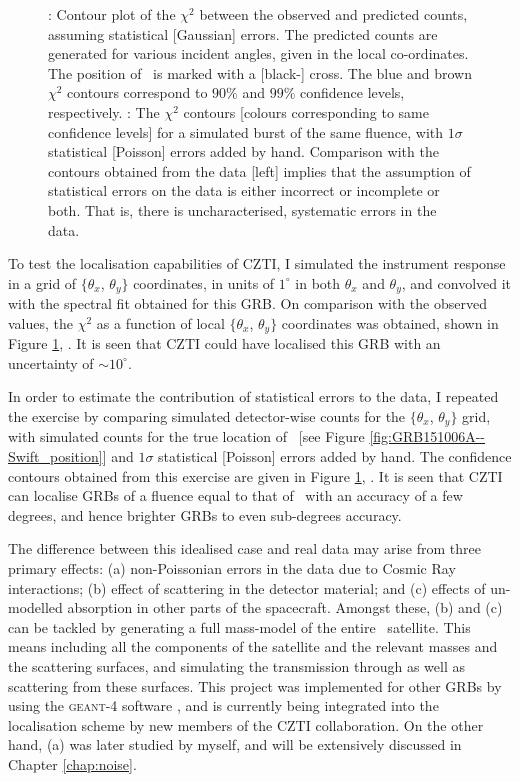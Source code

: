 \begin{figure}
\begin{center}
\caption[Localisation capabilities of \AS -CZTI: theory and practice]{\eL: Contour plot of the $\chi^2$ between the observed and predicted counts, assuming statistical [Gaussian] errors. The predicted counts are generated for various incident angles, given in the local co-ordinates. The position of \grb\ is marked with a [black-] cross. The blue and brown $\chi^2$ contours correspond to $90 \%$ and $99 \%$ confidence levels, respectively. \eR: The $\chi^2$ contours [colours corresponding to same confidence levels] for a simulated burst of the same fluence, with $1 \sigma$ statistical [Poisson] errors added by hand. Comparison with the contours obtained from the data [left] implies that the assumption of statistical errors on the data is either incorrect or incomplete or both. That is, there is uncharacterised, systematic errors in the data.}
\label{fig:GRB151006A--contours}
\end{center}
\end{figure}

To test the localisation capabilities of CZTI, I simulated the instrument response in a grid of $\{ \theta_x$, $\theta_y \}$ coordinates, in units of $1^{\circ}$ in both $\theta_x$ and $\theta_y$, and convolved it with the spectral fit obtained for this GRB. On comparison with the observed values, the $\chi^2$ as a function of local $\{ \theta_x$, $\theta_y \}$ coordinates was obtained, shown in Figure \ref{fig:GRB151006A--contours}, \eL. It is seen that CZTI could have localised this GRB with an uncertainty of $\sim 10^{\circ}$.

In order to estimate the contribution of statistical errors to the data, I repeated the exercise by comparing simulated detector-wise counts for the $\{ \theta_x$, $\theta_y \}$ grid, with simulated counts for the true location of \grb\ [see Figure \ref{fig:GRB151006A--Swift_position}] and $1 \sigma$ statistical [Poisson] errors added by hand. The confidence contours obtained from this exercise are given in Figure \ref{fig:GRB151006A--contours}, \eR. It is seen that CZTI can localise GRBs of a fluence equal to that of \grb\ with an accuracy of a few degrees, and hence brighter GRBs to even sub-degrees accuracy.

The difference between this idealised case and real data may arise from three primary effects: (a) non-Poissonian errors in the data due to Cosmic Ray interactions; (b) effect of scattering in the detector material; and (c) effects of un-modelled absorption in other parts of the spacecraft. Amongst these, (b) and (c) can be tackled by generating a full mass-model of the entire \AS\ satellite. This means including all the components of the satellite and the relevant masses and the scattering surfaces, and simulating the transmission through as well as scattering from these surfaces. This project was implemented for other GRBs by using the \textsc{geant-4} software \citep{Bhalerao_et_al.-2017-ApJ-A_Tale_of_Two_Transients}, and is currently being integrated into the localisation scheme by new members of the CZTI collaboration. On the other hand, (a) was later studied by myself, and will be extensively discussed in Chapter \ref{chap:noise}.

